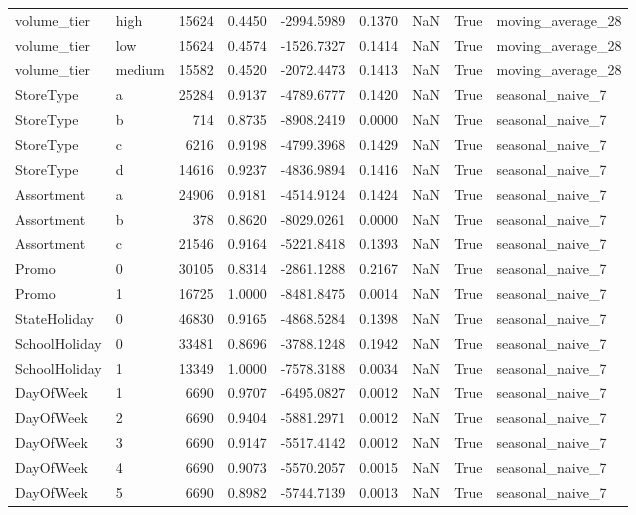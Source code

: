 \begin{table}
\begin{tabular}{llrrrrrrl}
volume\_tier & high & 15624 & 0.4450 & -2994.5989 & 0.1370 & NaN & True & moving\_average\_28 \\
volume\_tier & low & 15624 & 0.4574 & -1526.7327 & 0.1414 & NaN & True & moving\_average\_28 \\
volume\_tier & medium & 15582 & 0.4520 & -2072.4473 & 0.1413 & NaN & True & moving\_average\_28 \\
StoreType & a & 25284 & 0.9137 & -4789.6777 & 0.1420 & NaN & True & seasonal\_naive\_7 \\
StoreType & b & 714 & 0.8735 & -8908.2419 & 0.0000 & NaN & True & seasonal\_naive\_7 \\
StoreType & c & 6216 & 0.9198 & -4799.3968 & 0.1429 & NaN & True & seasonal\_naive\_7 \\
StoreType & d & 14616 & 0.9237 & -4836.9894 & 0.1416 & NaN & True & seasonal\_naive\_7 \\
Assortment & a & 24906 & 0.9181 & -4514.9124 & 0.1424 & NaN & True & seasonal\_naive\_7 \\
Assortment & b & 378 & 0.8620 & -8029.0261 & 0.0000 & NaN & True & seasonal\_naive\_7 \\
Assortment & c & 21546 & 0.9164 & -5221.8418 & 0.1393 & NaN & True & seasonal\_naive\_7 \\
Promo & 0 & 30105 & 0.8314 & -2861.1288 & 0.2167 & NaN & True & seasonal\_naive\_7 \\
Promo & 1 & 16725 & 1.0000 & -8481.8475 & 0.0014 & NaN & True & seasonal\_naive\_7 \\
StateHoliday & 0 & 46830 & 0.9165 & -4868.5284 & 0.1398 & NaN & True & seasonal\_naive\_7 \\
SchoolHoliday & 0 & 33481 & 0.8696 & -3788.1248 & 0.1942 & NaN & True & seasonal\_naive\_7 \\
SchoolHoliday & 1 & 13349 & 1.0000 & -7578.3188 & 0.0034 & NaN & True & seasonal\_naive\_7 \\
DayOfWeek & 1 & 6690 & 0.9707 & -6495.0827 & 0.0012 & NaN & True & seasonal\_naive\_7 \\
DayOfWeek & 2 & 6690 & 0.9404 & -5881.2971 & 0.0012 & NaN & True & seasonal\_naive\_7 \\
DayOfWeek & 3 & 6690 & 0.9147 & -5517.4142 & 0.0012 & NaN & True & seasonal\_naive\_7 \\
DayOfWeek & 4 & 6690 & 0.9073 & -5570.2057 & 0.0015 & NaN & True & seasonal\_naive\_7 \\
DayOfWeek & 5 & 6690 & 0.8982 & -5744.7139 & 0.0013 & NaN & True & seasonal\_naive\_7 \\

\end{tabular}
\end{table}
